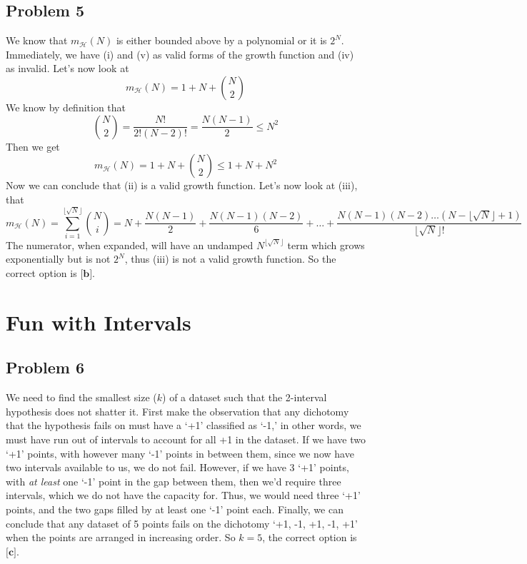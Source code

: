 \documentclass{article}
\begin{document}
\subsection*{Problem 5}
We know that $m_{\mathcal{H}}(N)$ is either bounded above by a polynomial or it is $2^{N}$. Immediately, we have (i) and (v) as valid forms of the growth function and (iv) as invalid. Let's now look at 
\begin{equation*}
    m_{\mathcal{H}}(N) = 1 + N + {{N}\choose{2}}
\end{equation*}
We know by definition that
\begin{equation*}
    {{N}\choose{2}} = \frac{N!}{2!(N - 2)!} = \frac{N(N-1)}{2} \leq N^{2}
\end{equation*}
Then we get
\begin{equation*}
    m_{\mathcal{H}}(N) = 1 + N + {{N}\choose{2}} \leq 1 + N + N^{2}
\end{equation*}
Now we can conclude that (ii) is a valid growth function. Let's now look at (iii), that
\begin{equation*}
    m_{\mathcal{H}}(N) = \sum_{i=1}^{\lfloor\sqrt{N}\rfloor}{{N}\choose{i}} = N + \frac{N(N-1)}{2} + \frac{N(N-1)(N-2)}{6} + \dots + \frac{N(N-1)(N-2)\dots (N - \lfloor \sqrt{N}\rfloor + 1)}{\lfloor \sqrt{N}\rfloor !}
\end{equation*}
The numerator, when expanded, will have an undamped $N^{\lfloor \sqrt{N} \rfloor}$ term which grows exponentially but is not $2^{N}$, thus (iii) is not a valid growth function. So the correct option is $\textbf{[b]}$. \newpage
\section*{Fun with Intervals}
\subsection*{Problem 6}
We need to find the smallest size ($k$) of a dataset such that the 2-interval hypothesis does not shatter it. First make the observation that any dichotomy that the hypothesis fails on must have a `+1' classified as `-1,' in other words, we must have run out of intervals to account for all +1 in the dataset. If we have two `+1' points, with however many `-1' points in between them, since we now have two intervals available to us, we do not fail. However, if we have 3 `+1' points, with \emph{at least} one `-1' point in the gap between them, then we'd require three intervals, which we do not have the capacity for. Thus, we would need three `+1' points, and the two gaps filled by at least one `-1' point each. Finally, we can conclude that any dataset of 5 points fails on the dichotomy `+1, -1, +1, -1, +1' when the points are arranged in increasing order. So $k =5$, the correct option is $\textbf{[c]}$. 
\end{document}
